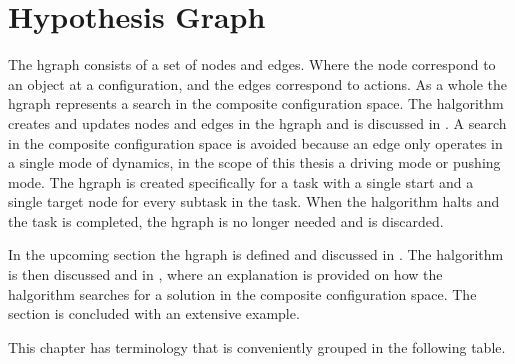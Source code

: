 \section{Hypothesis Graph}%
\label{sec:hgraph}
The \acf{hgraph} consists of a set of nodes and edges. Where the node correspond to an object at a configuration, and the edges correspond to actions. As a whole the \ac{hgraph} represents a search in the composite configuration space. The \ac{halgorithm} creates and updates nodes and edges in the \ac{hgraph} and is discussed in . A search in the composite configuration space is avoided because an edge only operates in a single mode of dynamics, in the scope of this thesis a driving mode or pushing mode. The \ac{hgraph} is created specifically for a task with a single start and a single target node for every subtask in the task. When the \ac{halgorithm} halts and the task is completed, the \ac{hgraph} is no longer needed and is discarded.\bs

In the upcoming section the \ac{hgraph} is defined and discussed in . The \ac{halgorithm} is then discussed and in , where an explanation is provided on how the \ac{halgorithm} searches for a solution in the composite configuration space. The section is concluded with an extensive example.\bs





This chapter has terminology that is conveniently grouped in the following table.

